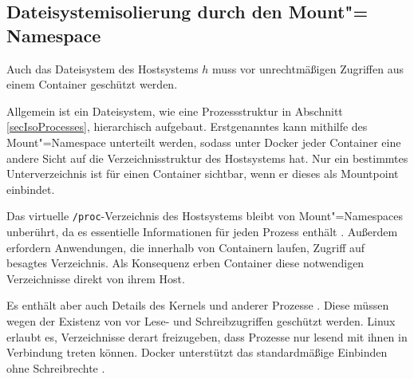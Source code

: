 \documentclass[../main.tex]{subfiles}
\begin{document}

    \subsection{Dateisystemisolierung durch den Mount"=\\Namespace}
			Auch das Dateisystem des Hostsystems \(h\) muss vor unrechtmäßigen Zugriffen aus einem Container \cbroken{} geschützt werden.

			Allgemein ist ein Dateisystem, wie eine Prozessstruktur in Abschnitt \ref{secIsoProcesses}, hierarchisch aufgebaut. Erstgenanntes kann mithilfe des Mount"=Namespace unterteilt werden, sodass unter Docker jeder Container eine andere Sicht auf die Verzeichnisstruktur des Hostsystems hat. Nur ein bestimmtes Unterverzeichnis ist für einen Container sichtbar, wenn er dieses als Mountpoint einbindet.

			Das virtuelle \texttt{/proc}-Verzeichnis des Hostsystems bleibt von Mount"=Namespaces unberührt, da es essentielle Informationen für jeden Prozess enthält \cite{creatingContainers}\cite{secPart1}. Außerdem erfordern Anwendungen, die innerhalb von Containern laufen, Zugriff auf besagtes Verzeichnis. Als Konsequenz erben Container diese notwendigen Verzeichnisse direkt von ihrem Host.

			Es enthält aber auch Details des Kernels und anderer Prozesse \cite{proc}. Diese müssen wegen der Existenz von \cbroken{} vor Lese- und Schreibzugriffen geschützt werden. Linux erlaubt es, Verzeichnisse derart freizugeben, dass Prozesse nur lesend mit ihnen in Verbindung treten können. Docker unterstützt das standardmäßige Einbinden ohne Schreibrechte \cite[S.4f.]{dockerSecIntro}.




\end{document}
